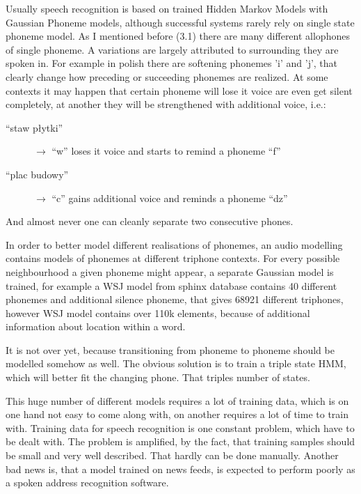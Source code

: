 \documentclass[12pt,a4paper,english]{article}
\begin{document}
Usually speech recognition is based on trained Hidden Markov Models with Gaussian Phoneme models, although successful systems rarely rely on single state phoneme model. \newline
As I mentioned before (3.1) there are many different allophones of single phoneme. A variations are largely attributed to surrounding they are spoken in. For example in polish there are softening phonemes 'i' and 'j', that clearly change how preceding or succeeding phonemes are realized. At some contexts it may happen that certain phoneme will lose it voice are even get silent completely, at another they will be strengthened with additional voice, i.e.: 
\begin{description}
	\item[“staw płytki”] $\rightarrow$ “w” loses it voice and starts to remind a phoneme “f”
	\item[“plac budowy”] $\rightarrow$ “c” gains additional voice and reminds a phoneme “dz”
\end{description}
And almost never one can cleanly separate two consecutive phones. \newline

 In order to better model different realisations of phonemes, an audio modelling contains models of phonemes at different triphone contexts. 
For every possible neighbourhood a given phoneme might appear, a separate Gaussian model is trained, for example a WSJ model from sphinx database contains 40 different phonemes and additional silence phoneme, that gives 68921 different triphones, however WSJ model contains over 110k elements,  because of additional information about location within a word. \newline

It is not over yet, because transitioning from phoneme to phoneme should be modelled somehow as well. The obvious solution is to train a triple state HMM, which will better fit the changing phone. That triples number of states. \newline

This huge number of different models requires a lot of training data, which is on one hand not easy to come along with, on another requires a lot of time to train with. \newline
Training data for speech recognition is one constant problem, which have to be dealt with. The problem is amplified, by the fact, that training samples should be small and very well described. That hardly can be done manually. \newline
Another bad news is, that a model trained on news feeds, is expected to perform poorly as a spoken address recognition software. \newline
\end{document}
